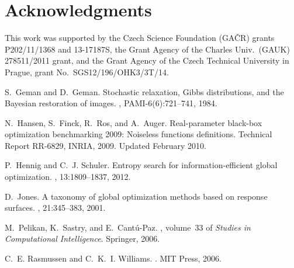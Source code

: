 \documentclass{sig-alternate}
\begin{document}


\section{Acknowledgments}

This work was supported by 
the Czech Science Foundation (GA\v{C}R) grants \hbox{P202/11/1368} and \hbox{13-17187S},
the Grant Agency of the Charles Univ.\ (GAUK) \hbox{278511/2011} grant, 
and
the Grant Agency of the Czech Technical University in Prague, grant No.~\hbox{SGS12/196/OHK3/3T/14}.

%

\begin{thebibliography}{1}

S.~Geman and D.~Geman.
\newblock Stochastic relaxation, {G}ibbs distributions, and the {B}ayesian
  restoration of images.
,
  PAMI-6(6):721--741, 1984.

N.~Hansen, S.~Finck, R.~Ros, and A.~Auger.
\newblock Real-parameter black-box optimization benchmarking 2009: Noiseless
  functions definitions.
\newblock Technical Report RR-6829, INRIA, 2009.
\newblock Updated February 2010.

P.~Hennig and C.~J. Schuler.
\newblock Entropy search for information-efficient global optimization.
, 13:1809--1837, 2012.

D.~Jones.
\newblock A taxonomy of global optimization methods based on response surfaces.
, 21:345--383, 2001.

M.~Pelikan, K.~Sastry, and E.~Cant\'{u}-Paz.
, volume~33 of
  {\em Studies in Computational Intelligence}.
\newblock Springer, 2006.

C.~E. Rasmussen and C.~K.~I. Williams.
.
\newblock MIT Press, 2006.

\end{thebibliography}
%
%
\end{document}
